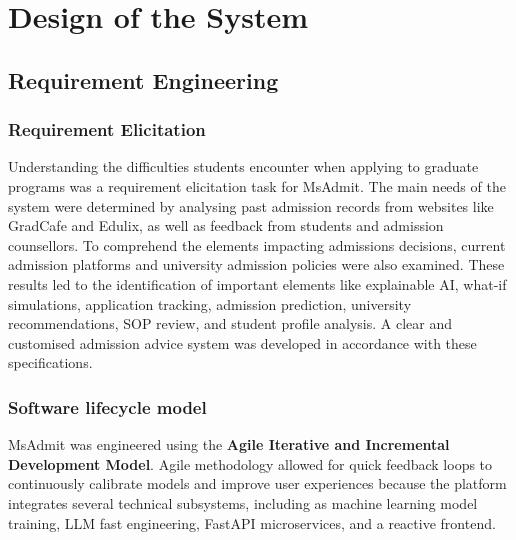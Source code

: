 \chapter{Design of the System} \label{chap4}
\newpage

\section{Requirement Engineering}

\subsection{Requirement Elicitation}
\justify
Understanding the difficulties students encounter when applying to graduate programs was a requirement elicitation task for MsAdmit. The main needs of the system were determined by analysing past admission records from websites like GradCafe and Edulix, as well as feedback from students and admission counsellors.
To comprehend the elements impacting admissions decisions, current admission platforms and university admission policies were also examined. These results led to the identification of important elements like explainable AI, what-if simulations, application tracking, admission prediction, university recommendations, SOP review, and student profile analysis. A clear and customised admission advice system was developed in accordance with these specifications.
\subsection{Software lifecycle model}


MsAdmit was engineered using the \textbf{Agile Iterative and Incremental Development Model}.  Agile methodology allowed for quick feedback loops to continuously calibrate models and improve user experiences because the platform integrates several technical subsystems, including as machine learning model training, LLM fast engineering, FastAPI microservices, and a reactive frontend.

